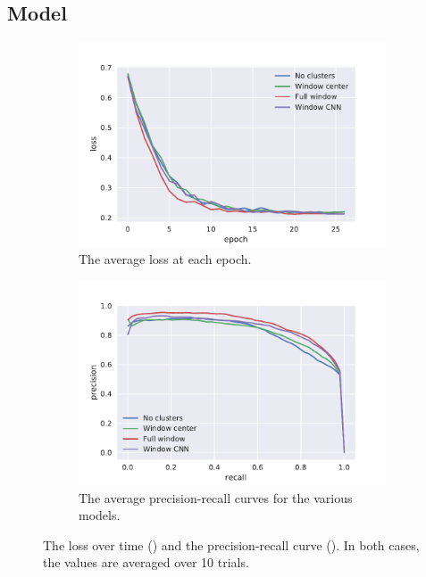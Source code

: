 \FloatBarrier%

\subsection{Model}
\begin{figure}[htbp]
  \centering
  \begin{subfigure}[t]{0.49\textwidth}
    \centering
    \includegraphics[width=\textwidth]{./figures/results/models/losses.pdf}
    \caption{The average loss at each epoch.\\}%
    \label{fig:model_loss}
  \end{subfigure}
  \begin{subfigure}[t]{0.49\textwidth}
    \centering
    \includegraphics[width=\textwidth]{./figures/results/models/pr.pdf}
    \caption{The average precision-recall curves for the various models.}%
    \label{fig:model_pr}
  \end{subfigure}
  \caption{The loss over time () and the
    precision-recall curve (). In both cases, the values are
    averaged over 10 trials.}%
    \label{fig:model_plots}
\end{figure}


